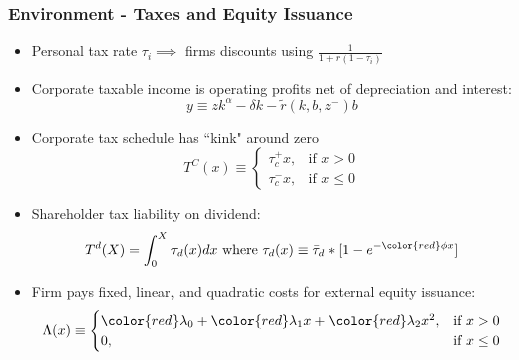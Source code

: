 \documentclass[usenames,dvipsnames, handout]{beamer}
\begin{document}
\begin{frame}
\frametitle{Environment - Taxes and Equity Issuance}
\small
\begin{itemize}
\item Personal tax rate $\tau_i \implies$ firms discounts using $\frac{1}{1 + r(1-\tau_i)}$
\item Corporate taxable income is operating profits net of depreciation and interest:
$$
y \equiv z k^\alpha - \delta k - \tilde r(k, b, z^-) b
$$
\item Corporate tax schedule has ``kink" around zero
$$
T^C(x) \equiv 
\begin{cases} 
\tau_c^+ x, & \text{if }x > 0 \\
\tau_c^- x, & \text{if }x \le 0
\end{cases}
$$
\item Shareholder tax liability on dividend:
$$
T^d(X) = \int_0^X \tau_d(x) dx \text{ where } \tau_d(x) \equiv \bar \tau_d * [1 - e^{-{\color{red}\phi} x}]
$$
\item Firm pays fixed, linear, and quadratic costs for external equity issuance:
$$
\Lambda(x) \equiv 
\begin{cases} 
{\color{red}\lambda_0} + {\color{red}\lambda_1} x + {\color{red}\lambda_2} x^2, & \text{if }x > 0 \\
0, & \text{if }x \le 0
\end{cases}
$$
\end{itemize}
\end{frame}
\end{document}
